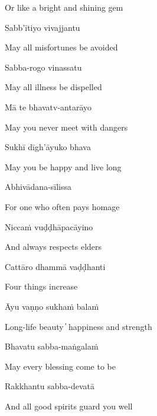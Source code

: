 \begin{cprenglish}
  Or like a bright and shining gem\\
\end{cprenglish}

Sabb'ītiyo vivajjantu

\begin{cprenglish}
  May all misfortunes be avoided
\end{cprenglish}

Sabba-rogo vinassatu

\begin{cprenglish}
  May all illness be dispelled
\end{cprenglish}

Mā te bhavatv-antarāyo

\begin{cprenglish}
  May you never meet with dangers
\end{cprenglish}

Sukhī dīgh'āyuko bhava

\begin{cprenglish}
  May you be happy and live long
\end{cprenglish}

Abhivādana-sīlissa

\begin{cprenglish}
  For one who often pays homage
\end{cprenglish}

Niccaṁ vuḍḍhāpacāyino

\begin{cprenglish}
  And always respects elders
\end{cprenglish}

Cattāro dhammā vaḍḍhanti

\begin{cprenglish}
  Four things increase
\end{cprenglish}

Āyu vaṇṇo sukhaṁ balaṁ

\begin{cprenglish}
  Long-life beauty  ̓  happiness and strength
\end{cprenglish}

Bhavatu sabba-maṅgalaṁ

\begin{cprenglish}
  May every blessing come to be
\end{cprenglish}

Rakkhantu sabba-devatā

\begin{cprenglish}
  And all good spirits guard you well
\end{cprenglish}

